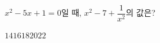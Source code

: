 $x^2-5x+1=0$일 때, $x^2-7+\dfrac{1}{x^2}$의 값은?
\begin{choices32}{$14$}{$16$}{$18$}{$20$}{$22$}\end{choices32}
